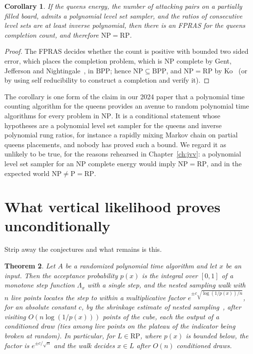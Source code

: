 \documentclass[11pt,twoside,openany]{book}
\theoremstyle{plain}
\newtheorem{theorem}{Theorem}[chapter]
\newtheorem{corollary}[theorem]{Corollary}
\theoremstyle{definition}
\theoremstyle{remark}
\newcommand{\RP}{\mathrm{RP}}
\newcommand{\BPP}{\mathrm{BPP}}
\newcommand{\NP}{\mathrm{NP}}
\newcommand{\Pc}{\mathrm{P}}
\begin{document}
\begin{corollary}
\label{cor:queens_nprp}
If the queens energy, the number of attacking pairs on a partially filled board, admits a polynomial level set sampler, and the ratios of consecutive level sets are at least inverse polynomial, then there is an FPRAS for the queens completion count, and therefore $\NP = \RP$.
\end{corollary}

\begin{proof}
The FPRAS decides whether the count is positive with bounded two sided error, which places the completion problem, which is $\NP$ complete by Gent, Jefferson and Nightingale~\cite{GJN}, in $\BPP$; hence $\NP \subseteq \BPP$, and $\NP = \RP$ by Ko~\cite{Ko} (or by using self reducibility to construct a completion and verify it).
\end{proof}

The corollary is one form of the claim in our 2024 paper that a polynomial time counting algorithm for the queens provides an avenue to random polynomial time algorithms for every problem in $\NP$. It is a conditional statement whose hypotheses are a polynomial level set sampler for the queens and inverse polynomial rung ratios, for instance a rapidly mixing Markov chain on partial queens placements, and nobody has proved such a bound. We regard it as unlikely to be true, for the reasons rehearsed in Chapter~\ref{ch:jvv}: a polynomial level set sampler for an $\NP$ complete energy would imply $\NP = \RP$, and in the expected world $\NP \neq \Pc = \RP$.

\section{What vertical likelihood proves unconditionally}

Strip away the conjectures and what remains is this.

\begin{theorem}
Let $A$ be a randomized polynomial time algorithm and let $x$ be an input. Then the acceptance probability $p(x)$ is the integral over $[0,1]$ of a monotone step function $\Lambda_x$ with a single step, and the nested sampling walk with $n$ live points locates the step to within a multiplicative factor $e^{\pm c \sqrt{\log(1/p(x)) / n}}$, for an absolute constant $c$, by the shrinkage estimate of nested sampling~\cite{Skilling, ChopinRobert}, after visiting $O(n \log(1/p(x)))$ points of the cube, each the output of a conditioned draw (ties among live points on the plateau of the indicator being broken at random). In particular, for $L \in \RP$, where $p(x)$ is bounded below, the factor is $e^{\pm c / \sqrt{n}}$ and the walk decides $x \in L$ after $O(n)$ conditioned draws.
\end{theorem}
\end{document}
